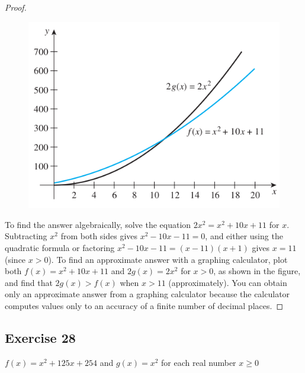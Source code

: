 \documentclass[14pt]{extarticle}
\begin{document}
\begin{proof}
    \begin{figure}[ht!]
        \centering
        \includegraphics[scale=0.5]{../images/11.1.27.png}
    \end{figure}

    To find the answer algebraically, solve the equation \(2x^2 = x^2 + 10x + 11\) for \(x\). Subtracting \(x^2\) from both
    sides gives \(x^2 - 10x - 11 = 0\), and either using the quadratic formula or factoring \(x^2-10x-11=(x - 11)(x + 1)\)
    gives \(x = 11\) (since \(x > 0\)). To find an approximate answer with a graphing calculator, plot both \(f(x) = x^2 +
    10x + 11\) and \(2g(x) = 2x^2\) for \(x > 0\), as shown in the figure, and find that \(2g(x) > f(x)\) when \(x > 11\)
    (approximately). You can obtain only an approximate answer from a graphing calculator because the calculator computes
    values only to an accuracy of a finite number of decimal places.
\end{proof}

\subsection{Exercise 28}
\(f(x) = x^2 + 125x + 254\) and \(g(x) = x^2\) for each real number \(x \geq 0\)
\end{document}
